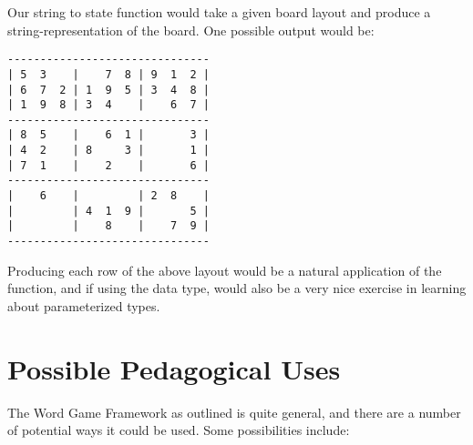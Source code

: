Our string to state function would take a given board layout and produce a string-representation of the board.  One possible output would be:

\begin{center}
\begin{verbatim}
-------------------------------
| 5  3    |    7  8 | 9  1  2 |
| 6  7  2 | 1  9  5 | 3  4  8 |
| 1  9  8 | 3  4    |    6  7 |
-------------------------------
| 8  5    |    6  1 |       3 |
| 4  2    | 8     3 |       1 |
| 7  1    |    2    |       6 |
-------------------------------
|    6    |         | 2  8    |
|         | 4  1  9 |       5 |
|         |    8    |    7  9 |
-------------------------------
\end{verbatim}
\end{center}

Producing each row of the above layout would be a natural application of the  function, and if using the  data type, would also be a very nice exercise in learning about parameterized types.






\section{Possible Pedagogical Uses}
\label{pedagogicalUses}

The Word Game Framework as outlined is quite general, and there are a number of potential ways it could be used.  Some possibilities include:

